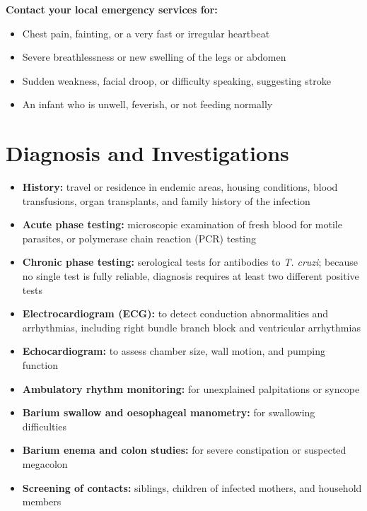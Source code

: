 \medskip
\textbf{Contact your local emergency services for:}
\begin{itemize}
    \item Chest pain, fainting, or a very fast or irregular heartbeat
    \item Severe breathlessness or new swelling of the legs or abdomen
    \item Sudden weakness, facial droop, or difficulty speaking, suggesting stroke
    \item An infant who is unwell, feverish, or not feeding normally
\end{itemize}

\section*{Diagnosis and Investigations}
\begin{itemize}
    \item \textbf{History:} travel or residence in endemic areas, housing conditions, blood transfusions, organ transplants, and family history of the infection
    \item \textbf{Acute phase testing:} microscopic examination of fresh blood for motile parasites, or polymerase chain reaction (PCR) testing
    \item \textbf{Chronic phase testing:} serological tests for antibodies to \textit{T. cruzi}; because no single test is fully reliable, diagnosis requires at least two different positive tests
    \item \textbf{Electrocardiogram (ECG):} to detect conduction abnormalities and arrhythmias, including right bundle branch block and ventricular arrhythmias
    \item \textbf{Echocardiogram:} to assess chamber size, wall motion, and pumping function
    \item \textbf{Ambulatory rhythm monitoring:} for unexplained palpitations or syncope
    \item \textbf{Barium swallow and oesophageal manometry:} for swallowing difficulties
    \item \textbf{Barium enema and colon studies:} for severe constipation or suspected megacolon
    \item \textbf{Screening of contacts:} siblings, children of infected mothers, and household members
\end{itemize}

